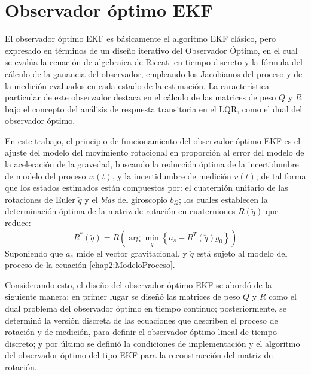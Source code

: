 \documentclass[10pt]{report}
\numberwithin{equation}{chapter}
\numberwithin{algorithm}{chapter}
\begin{document}
\section{Observador óptimo EKF}
El observador óptimo EKF es básicamente el algoritmo EKF clásico, pero expresado en términos de un diseño iterativo del Observador Óptimo, en el cual se evalúa la ecuación de algebraica de Riccati en tiempo discreto y la fórmula del cálculo de la ganancia del observador, empleando los Jacobianos del proceso y de la medición evaluados en cada estado de la estimación. La característica particular de este observador destaca en el cálculo de las matrices de peso $Q$ y $R$ bajo el concepto del análisis de respuesta transitoria en el LQR, como el dual del observador óptimo.\par
En este trabajo, el principio de funcionamiento del observador óptimo EKF es el ajuste del modelo del movimiento rotacional en proporción al error del modelo de la aceleración de la gravedad, buscando la reducción óptima de la incertidumbre de modelo del proceso $w(t)$, y la incertidumbre de medición $v(t)$; de tal forma que los estados estimados están compuestos por: el cuaternión unitario de las rotaciones de Euler $\breve{q}$ y el \emph{bias} del giroscopio $b_{\Omega}$; los cuales establecen la determinación óptima de la matriz de rotación en cuaterniones $R(\breve{q})$ que reduce:
\begin{equation}
R^*(\breve{q})=R\left(\arg\min_{\breve{q}}\left\{a_s-R^T(\breve{q})g_0\right\}\right)
\end{equation} 
Suponiendo que $a_s$ mide el vector gravitacional, y $\breve{q}$ está sujeto al modelo del proceso de la ecuación \eqref{chap2:ModeloProceso}.\par
%
Considerando esto, el diseño del observador óptimo EKF se abordó de la siguiente manera: en primer lugar se diseñó las matrices de peso $Q$ y $R$ como el dual problema del observador óptimo en tiempo continuo; posteriormente, se determinó la versión discreta de las ecuaciones que describen el proceso de rotación y de medición, para definir el observador óptimo lineal de tiempo discreto; y por último se definió la condiciones de implementación y el algoritmo del observador óptimo del tipo EKF para la reconstrucción del matriz de rotación. 
\end{document}

